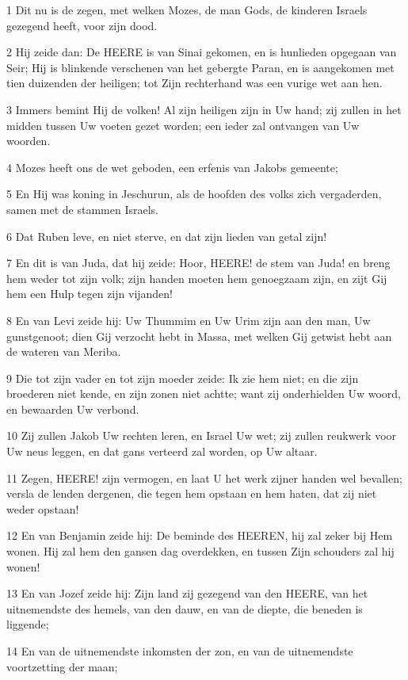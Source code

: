 \par 1 Dit nu is de zegen, met welken Mozes, de man Gods, de kinderen Israels gezegend heeft, voor zijn dood.
\par 2 Hij zeide dan: De HEERE is van Sinai gekomen, en is hunlieden opgegaan van Seir; Hij is blinkende verschenen van het gebergte Paran, en is aangekomen met tien duizenden der heiligen; tot Zijn rechterhand was een vurige wet aan hen.
\par 3 Immers bemint Hij de volken! Al zijn heiligen zijn in Uw hand; zij zullen in het midden tussen Uw voeten gezet worden; een ieder zal ontvangen van Uw woorden.
\par 4 Mozes heeft ons de wet geboden, een erfenis van Jakobs gemeente;
\par 5 En Hij was koning in Jeschurun, als de hoofden des volks zich vergaderden, samen met de stammen Israels.
\par 6 Dat Ruben leve, en niet sterve, en dat zijn lieden van getal zijn!
\par 7 En dit is van Juda, dat hij zeide: Hoor, HEERE! de stem van Juda! en breng hem weder tot zijn volk; zijn handen moeten hem genoegzaam zijn, en zijt Gij hem een Hulp tegen zijn vijanden!
\par 8 En van Levi zeide hij: Uw Thummim en Uw Urim zijn aan den man, Uw gunstgenoot; dien Gij verzocht hebt in Massa, met welken Gij getwist hebt aan de wateren van Meriba.
\par 9 Die tot zijn vader en tot zijn moeder zeide: Ik zie hem niet; en die zijn broederen niet kende, en zijn zonen niet achtte; want zij onderhielden Uw woord, en bewaarden Uw verbond.
\par 10 Zij zullen Jakob Uw rechten leren, en Israel Uw wet; zij zullen reukwerk voor Uw neus leggen, en dat gans verteerd zal worden, op Uw altaar.
\par 11 Zegen, HEERE! zijn vermogen, en laat U het werk zijner handen wel bevallen; versla de lenden dergenen, die tegen hem opstaan en hem haten, dat zij niet weder opstaan!
\par 12 En van Benjamin zeide hij: De beminde des HEEREN, hij zal zeker bij Hem wonen. Hij zal hem den gansen dag overdekken, en tussen Zijn schouders zal hij wonen!
\par 13 En van Jozef zeide hij: Zijn land zij gezegend van den HEERE, van het uitnemendste des hemels, van den dauw, en van de diepte, die beneden is liggende;
\par 14 En van de uitnemendste inkomsten der zon, en van de uitnemendste voortzetting der maan;
